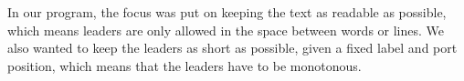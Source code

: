 \documentclass[11pt,a4paper]{article}
\begin{document}
In our program, %
the focus was put on keeping the text as readable as possible, which means leaders are only allowed in the space between words or lines. We also wanted to keep the leaders  as short as possible, given a fixed label and port position, which means that the leaders have to be monotonous.








\end{document}

